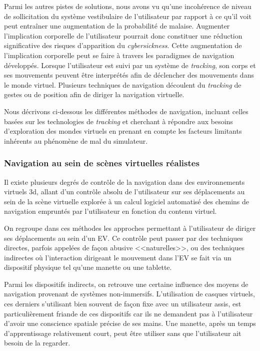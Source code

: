 Parmi les autres pistes de solutions, nous avons vu qu'une incohérence de niveau de sollicitation du système vestibulaire de l'utilisateur par rapport à ce qu'il voit peut entraîner une augmentation de la probabilité de malaise. Augmenter l'implication corporelle de l'utilisateur pourrait donc constituer une réduction significative des risques d'apparition du \textit{cybersickness}. Cette augmentation de l'implication corporelle peut se faire à travers les paradigmes de navigation développés. Lorsque l'utilisateur est suivi par un système de \textit{tracking}, son corps et ses mouvements peuvent être interprétés afin de déclencher des mouvements dans le monde virtuel. Plusieurs techniques de navigation découlent du \textit{tracking} de gestes ou de position afin de diriger la navigation virtuelle.

Nous décrivons ci-dessous les différentes méthodes de navigation, incluant celles basées sur les technologies de \textit{tracking} et cherchant à répondre aux besoins d'exploration des mondes virtuels en prenant en compte les facteurs limitants inhérents au phénomène de mal du simulateur.


\subsubsection{Navigation au sein de scènes virtuelles réalistes}

Il existe plusieurs degrés de contrôle de la navigation dans des environnements virtuels 3d, allant d'un contrôle absolu de l'utilisateur sur ses déplacements au sein de la scène virtuelle explorée à un calcul logiciel automatisé des chemins de navigation empruntés par l'utilisateur en fonction du contenu virtuel.


On regroupe dans ces méthodes les approches permettant à l'utilisateur de diriger ses déplacements au sein d'un EV. Ce contrôle peut passer par des techniques directes, parfois appelées de façon abusive <<naturelles>>, ou des techniques indirectes où l'interaction dirigeant le mouvement dans l'EV se fait via un dispositif physique tel qu'une manette ou une tablette.

Parmi les dispositifs indirects, on retrouve une certaine influence des moyens de navigation provenant de systèmes non-immersifs. L'utilisation de casques virtuels, ces derniers s'utilisant bien souvent de façon fixe avec un utilisateur assis, est particulièrement friande de ces dispositifs car ils ne demandent pas à l'utilisateur d'avoir une conscience spatiale précise de ses mains. Une manette, après un temps d'apprentissage relativement court, peut être utiliser sans que l'utilisateur ait besoin de la regarder. 

